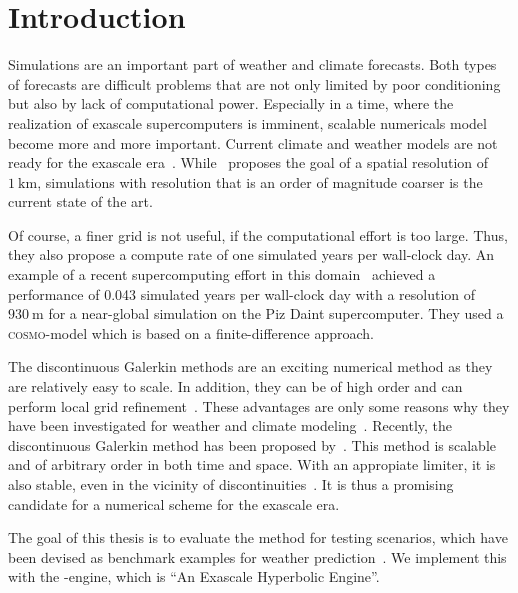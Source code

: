 \chapter{Introduction}\label{chap:introduction}
Simulations are an important part of weather and climate forecasts.
Both types of forecasts are difficult problems that are not only limited by poor conditioning but also by lack of computational power.
Especially in a time, where the realization of exascale supercomputers is imminent, scalable numericals model become more and more important.
Current climate and weather models are not ready for the exascale era~\cite{schulthess2018reflecting}.
While~\cite{schulthess2018reflecting} proposes the goal of a spatial resolution of $\SI{1}{\kilo\meter}$, simulations with resolution that is an order of magnitude coarser is the current state of the art.

Of course, a finer grid is not useful, if the computational effort is too large.
Thus, they also propose a compute rate of one simulated years per wall-clock day.
An example of a recent supercomputing effort in this domain~\cite{fuhrer2018near} achieved a performance of 0.043 simulated years per wall-clock day with a resolution of $\SI{930}{\m}$ for a near-global simulation on the Piz Daint supercomputer.
They used a \textsc{cosmo}-model which is based on a finite-difference approach.

The discontinuous Galerkin methods are an exciting numerical method as they are relatively easy to scale.
In addition, they can be of high order and can perform local grid refinement~\cite{hesthaven2008nodal}.
These advantages are only some reasons why they have been investigated for weather and climate modeling~\cite{muller2010adaptive,giraldo2008study}.
Recently, the \ader{} discontinuous Galerkin method has been proposed by~\cite{dumbser2008unified}.
This method is scalable and of arbitrary order in both time and space.
With an appropiate limiter, it is also stable, even in the vicinity of discontinuities~\cite{dumbser2016simple}.
It is thus a promising candidate for a numerical scheme for the exascale era.

The goal of this thesis is to evaluate the \aderdg{} method for testing scenarios, which have been devised as benchmark examples for weather prediction~\cite{robert1993bubble,giraldo2008study}.
We implement this with the \exahype{}-engine, which is \enquote{An Exascale Hyperbolic \pde{} Engine}.

